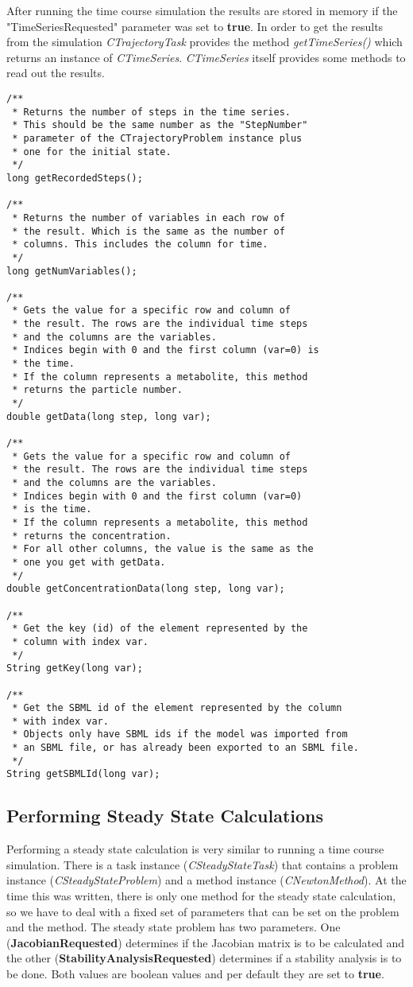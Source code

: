 \documentclass[a4,10pt]{article}
\begin{document}
After running the time course simulation the results are stored in memory if the "TimeSeriesRequested" parameter was set to \textbf{true}. In order to get the results from the simulation \textit{CTrajectoryTask} provides the method \textit{getTimeSeries()} which returns an instance of \textit{CTimeSeries}.
\textit{CTimeSeries} itself provides some methods to read out the results.

\begin{lstlisting}
/**
 * Returns the number of steps in the time series.
 * This should be the same number as the "StepNumber"
 * parameter of the CTrajectoryProblem instance plus
 * one for the initial state.
 */
long getRecordedSteps();

/**
 * Returns the number of variables in each row of
 * the result. Which is the same as the number of 
 * columns. This includes the column for time.
 */
long getNumVariables();

/**
 * Gets the value for a specific row and column of 
 * the result. The rows are the individual time steps 
 * and the columns are the variables.
 * Indices begin with 0 and the first column (var=0) is 
 * the time.
 * If the column represents a metabolite, this method 
 * returns the particle number.
 */
double getData(long step, long var);

/**
 * Gets the value for a specific row and column of
 * the result. The rows are the individual time steps
 * and the columns are the variables.
 * Indices begin with 0 and the first column (var=0)
 * is the time.
 * If the column represents a metabolite, this method
 * returns the concentration.
 * For all other columns, the value is the same as the 
 * one you get with getData.
 */
double getConcentrationData(long step, long var);

/**
 * Get the key (id) of the element represented by the
 * column with index var.
 */
String getKey(long var);

/**
 * Get the SBML id of the element represented by the column
 * with index var.
 * Objects only have SBML ids if the model was imported from 
 * an SBML file, or has already been exported to an SBML file.
 */
String getSBMLId(long var);
\end{lstlisting}


\subsection{Performing Steady State Calculations}
Performing a steady state calculation is very similar to running a time course simulation. There is a task instance (\textit{CSteadyStateTask}) that contains a problem instance (\textit{CSteadyStateProblem}) and a method instance (\textit{CNewtonMethod}).
At the time this was written, there is only one method for the steady state calculation, so we have to deal with a fixed set of parameters that can be set on the problem and the method.
The steady state problem has two parameters. One (\textbf{JacobianRequested}) determines if the Jacobian matrix is to be calculated and the other (\textbf{StabilityAnalysisRequested}) determines if a stability analysis is to be done. Both values are boolean values and per default they are set to \textbf{true}.
\end{document}

